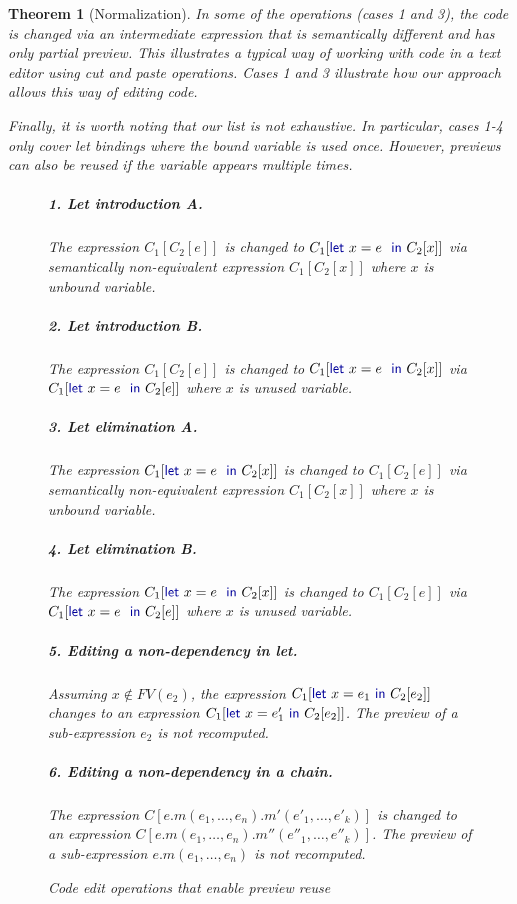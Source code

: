 \documentclass[acmsmall,anonymous,fleqn]{acmart}\settopmatter{printfolios=false,printccs=false,printacmref=false}
\newcounter{thc}
\theoremstyle{plain}
\newtheorem{theorem}[thc]{Theorem}
\theoremstyle{definition}
\newcommand{\kvd}[1]{\textnormal{\textcolor{kvdclr}{\sffamily #1}}}
\begin{document}
\begin{theorem}[Normalization]
In some of the operations (cases 1 and 3), the code is changed via an intermediate expression
that is semantically different and has only partial preview. This illustrates a typical way of
working with code in a text editor using cut and paste operations. Cases 1 and 3 illustrate how
our approach allows this way of editing code.

Finally, it is worth noting that our list is not exhaustive. In particular, cases 1-4 only cover
let bindings where the bound variable is used once. However, previews can also be reused if the
variable appears multiple times.


\begin{figure}[t]
\raggedright
\subparagraph{1. Let introduction A.}
The expression $C_1[C_2[e]]$ is changed to $C_1[\kvd{let}~x=e~\kvd{in}~C_2[x]]$
via semantically non-equivalent expression $C_1[C_2[x]]$ where $x$ is unbound variable.

\subparagraph{2. Let introduction B.}
The expression $C_1[C_2[e]]$ is changed to $C_1[\kvd{let}~x=e~\kvd{in}~C_2[x]]$
via $C_1[\kvd{let}~x=e~\kvd{in}~C_2[e]]$ where $x$ is unused variable.

\subparagraph{3. Let elimination A.} The expression
$C_1[\kvd{let}~x=e~\kvd{in}~C_2[x]]$ is changed to
$C_1[C_2[e]]$ via semantically non-equivalent expression
$C_1[C_2[x]]$ where $x$ is unbound variable.

\subparagraph{4. Let elimination B.} The expression
$C_1[\kvd{let}~x=e~\kvd{in}~C_2[x]]$ is changed to
$C_1[C_2[e]]$ via $C_1[\kvd{let}~x=e~\kvd{in}~C_2[e]]$
where $x$ is unused variable.

\subparagraph{5. Editing a non-dependency in let.} Assuming $x\notin FV(e_2)$, the expression
$C_1[\kvd{let}~x=e_1~\kvd{in}~C_2[e_2]]$ changes to an expression
$C_1[\kvd{let}~x=e_1'~\kvd{in}~C_2[e_2]]$. The preview of a sub-expression $e_2$ is not recomputed.

\subparagraph{6. Editing a non-dependency in a chain.} The expression
$C[e.m(e_1, \ldots, e_n).m'(e'_1, \ldots, e'_k)]$ is changed to an expression
$C[e.m(e_1, \ldots, e_n).m''(e''_1, \ldots, e''_k)]$. The preview of a sub-expression
$e.m(e_1, \ldots, e_n)$ is not recomputed.

\caption{Code edit operations that enable preview reuse}
\label{fig:operations}
\end{figure}



\end{theorem}
\end{document}
